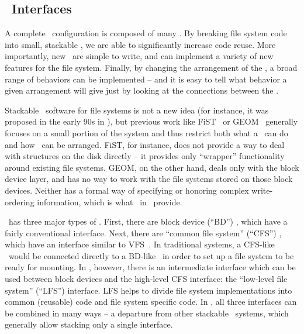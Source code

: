 \subsection {\Module\ Interfaces}
\label{sec:design:interfaces}

A complete \Kudos\ configuration is composed of many \modules. By breaking file
system code into small, stackable \modules, we are able to significantly
increase code reuse. More importantly, new \modules\ are simple to write, and
can implement a variety of new features for the file system. Finally, by
changing the arrangement of the \modules, a broad range of behaviors can be
implemented -- and it is easy to tell what behavior a given arrangement will
give just by looking at the connections between the \modules.


Stackable \module\ software for file systems is not a new idea (for instance, it
was proposed in the early 90s in \cite{rosenthal90evolving, heidemann91layered,
skinner93stacking, heidemann94filesystem}), but previous work like
FiST~\cite{zadok00fist} or GEOM~\cite{geom} generally focuses on a small portion
of the system and thus restrict both what a \module\ can do and how \modules\
can be arranged. FiST, for instance, does not provide a way to deal with
structures on the disk directly -- it provides only ``wrapper'' functionality
around existing file systems. GEOM, on the other hand, deals only with the block
device layer, and has no way to work with the file systems stored on those block
devices. Neither has a formal way of specifying or honoring complex
write-ordering information, which is what \chdescs\ in \Kudos\ provide.

\Kudos\ has three major types of \modules. First, there are block device
(``BD'') \modules, which have a fairly conventional interface. Next, there are
``common file system'' (``CFS'') \modules, which have an interface similar to
VFS~\cite{kleiman86vnodes}. In traditional systems, a CFS-like \module\ would be
connected directly to a BD-like \module\ in order to set up a file system to be
ready for mounting. In \Kudos, however, there is an intermediate interface which
can be used between block devices and the high-level CFS interface: the
``low-level file system'' (``LFS'') interface. LFS helps to divide file system
implementations into common (reusable) code and file system specific code. In
\Kudos, all three interfaces can be combined in many ways -- a departure from
other stackable \module\ systems, which generally allow stacking only a single
interface.

